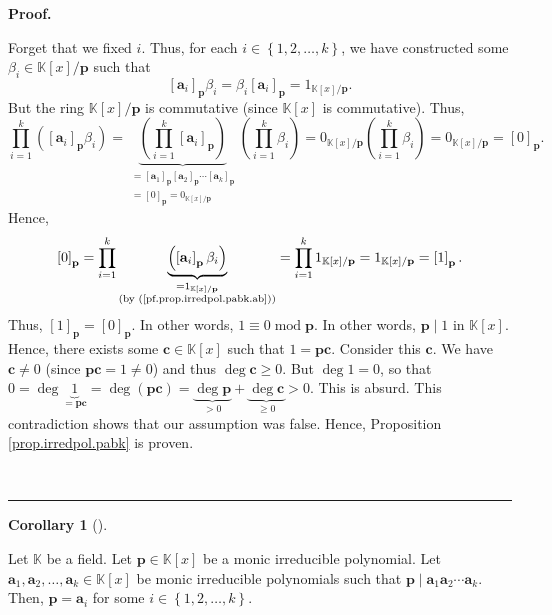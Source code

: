 \documentclass[numbers=enddot,12pt,final,onecolumn,notitlepage]{scrartcl}%
\theoremstyle{definition}
\newtheorem{coro}[theo]{Corollary}
\newenvironment{corollary}[1][]
{\begin{coro}[#1]\begin{leftbar}}
{\end{leftbar}\end{coro}}
\newenvironment{fineprint}{\begin{small}}{\end{small}}
\newenvironment{proof}[1][Proof]{\noindent\textbf{#1.} }{\ \rule{0.5em}{0.5em}}
\let\prodnonlimits\prod
\renewcommand{\prod}{\prodnonlimits\limits}
\begin{document}
\begin{proof}
\begin{fineprint}
Forget that we fixed $i$. Thus, for each $i\in\left\{  1,2,\ldots,k\right\}
$, we have constructed some $\beta_{i}\in\mathbb{K}\left[  x\right]
/\mathbf{p}$ such that
\begin{equation}
\left[  \mathbf{a}_{i}\right]  _{\mathbf{p}}\beta_{i}=\beta_{i}\left[
\mathbf{a}_{i}\right]  _{\mathbf{p}}=1_{\mathbb{K}\left[  x\right]
/\mathbf{p}}. \label{pf.prop.irredpol.pabk.ab}%
\end{equation}
But the ring $\mathbb{K}\left[  x\right]  /\mathbf{p}$ is commutative (since
$\mathbb{K}\left[  x\right]  $ is commutative). Thus,%
\[
\prod_{i=1}^{k}\left(  \left[  \mathbf{a}_{i}\right]  _{\mathbf{p}}\beta
_{i}\right)  =\underbrace{\left(  \prod_{i=1}^{k}\left[  \mathbf{a}%
_{i}\right]  _{\mathbf{p}}\right)  }_{\substack{=\left[  \mathbf{a}%
_{1}\right]  _{\mathbf{p}}\left[  \mathbf{a}_{2}\right]  _{\mathbf{p}}%
\cdots\left[  \mathbf{a}_{k}\right]  _{\mathbf{p}}\\=\left[  0\right]
_{\mathbf{p}}=0_{\mathbb{K}\left[  x\right]  /\mathbf{p}}}}\left(  \prod
_{i=1}^{k}\beta_{i}\right)  =0_{\mathbb{K}\left[  x\right]  /\mathbf{p}%
}\left(  \prod_{i=1}^{k}\beta_{i}\right)  =0_{\mathbb{K}\left[  x\right]
/\mathbf{p}}=\left[  0\right]  _{\mathbf{p}}.
\]
Hence,%
\[
\left[  0\right]  _{\mathbf{p}}=\prod_{i=1}^{k}\underbrace{\left(  \left[
\mathbf{a}_{i}\right]  _{\mathbf{p}}\beta_{i}\right)  }%
_{\substack{=1_{\mathbb{K}\left[  x\right]  /\mathbf{p}}\\\text{(by
(\ref{pf.prop.irredpol.pabk.ab}))}}}=\prod_{i=1}^{k}1_{\mathbb{K}\left[
x\right]  /\mathbf{p}}=1_{\mathbb{K}\left[  x\right]  /\mathbf{p}}=\left[
1\right]  _{\mathbf{p}}.
\]
Thus, $\left[  1\right]  _{\mathbf{p}}=\left[  0\right]  _{\mathbf{p}}$. In
other words, $1\equiv0\operatorname{mod}\mathbf{p}$. In other words,
$\mathbf{p}\mid1$ in $\mathbb{K}\left[  x\right]  $. Hence, there exists some
$\mathbf{c}\in\mathbb{K}\left[  x\right]  $ such that $1=\mathbf{pc}$.
Consider this $\mathbf{c}$. We have $\mathbf{c}\neq0$ (since $\mathbf{pc}%
=1\neq0$) and thus $\deg\mathbf{c}\geq0$. But $\deg1=0$, so that
$0=\deg\underbrace{1}_{=\mathbf{pc}}=\deg\left(  \mathbf{pc}\right)
=\underbrace{\deg\mathbf{p}}_{>0}+\underbrace{\deg\mathbf{c}}_{\geq0}>0$. This
is absurd. This contradiction shows that our assumption was false. Hence,
Proposition \ref{prop.irredpol.pabk} is proven.
\end{fineprint}
\end{proof}

\begin{corollary}
\label{cor.irredpol.pabk2}Let $\mathbb{K}$ be a field. Let $\mathbf{p}%
\in\mathbb{K}\left[  x\right]  $ be a monic irreducible polynomial. Let
$\mathbf{a}_{1},\mathbf{a}_{2},\ldots,\mathbf{a}_{k}\in\mathbb{K}\left[
x\right]  $ be monic irreducible polynomials such that $\mathbf{p}%
\mid\mathbf{a}_{1}\mathbf{a}_{2}\mathbf{\cdots a}_{k}$. Then, $\mathbf{p}%
=\mathbf{a}_{i}$ for some $i\in\left\{  1,2,\ldots,k\right\}  $.
\end{corollary}
\end{document}

